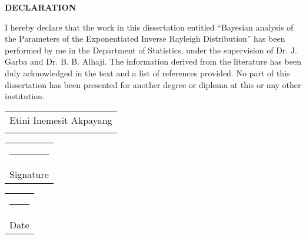 \documentclass[a4paper,12pt]{report}
\begin{document}
\restoregeometry

\newpage
\begin{center}
\bf	DECLARATION\\
\end{center}
 {\singlespacing I hereby declare that the work in this dissertation entitled ``Bayesian analysis of the Parameters of the Exponentiated Inverse Rayleigh Distribution'' has been performed by me in the Department of Statistics, under the supervision of Dr. J. Garba and Dr. B. B. Alhaji. The information derived from the literature has been duly acknowledged in the text and a list of references provided. No part of this dissertation has been presented for another degree or diploma at this or any other institution. \vspace{2.5cm}\\

\noindent
\begin{tabular}[t]{c}
	Etini Inemesit Akpayang\\
	  \hspace{2cm}
\end{tabular}%
\hspace{1cm}
\begin{tabular}[t]{c}
	\rule{3cm}{0.4pt}\\Signature
\end{tabular}%
\hspace{1cm}
\begin{tabular}[t]{c}
	\rule{3cm}{0.4pt}\\Date
\end{tabular}%
\hfill\strut


}
\end{document}
